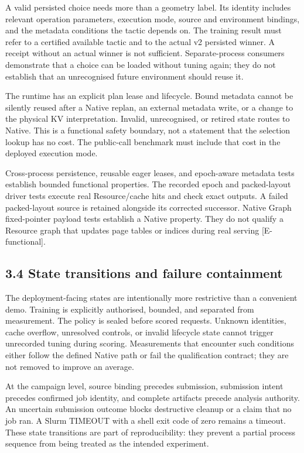 \documentclass[11pt,a4paper]{article}
\begin{document}
A valid persisted choice needs more than a geometry label. Its identity includes relevant operation parameters, execution mode, source and environment bindings, and the metadata conditions the tactic depends on. The training result must refer to a certified available tactic and to the actual v2 persisted winner. A receipt without an actual winner is not sufficient. Separate-process consumers demonstrate that a choice can be loaded without tuning again; they do not establish that an unrecognised future environment should reuse it.


The runtime has an explicit plan lease and lifecycle. Bound metadata cannot be silently reused after a Native replan, an external metadata write, or a change to the physical KV interpretation. Invalid, unrecognised, or retired state routes to Native. This is a functional safety boundary, not a statement that the selection lookup has no cost. The public-call benchmark must include that cost in the deployed execution mode.


Cross-process persistence, reusable eager leases, and epoch-aware metadata tests establish bounded functional properties. The recorded epoch and packed-layout driver tests execute real Resource/\allowbreak{}cache hits and check exact outputs. A failed packed-layout source is retained alongside its corrected successor. Native Graph fixed-pointer payload tests establish a Native property. They do not qualify a Resource graph that updates page tables or indices during real serving [E-functional].


\subsection*{3.4 State transitions and failure containment}

The deployment-facing states are intentionally more restrictive than a convenient demo. Training is explicitly authorised, bounded, and separated from measurement. The policy is sealed before scored requests. Unknown identities, cache overflow, unresolved controls, or invalid lifecycle state cannot trigger unrecorded tuning during scoring. Measurements that encounter such conditions either follow the defined Native path or fail the qualification contract; they are not removed to improve an average.


At the campaign level, source binding precedes submission, submission intent precedes confirmed job identity, and complete artifacts precede analysis authority. An uncertain submission outcome blocks destructive cleanup or a claim that no job ran. A Slurm TIMEOUT with a shell exit code of zero remains a timeout. These state transitions are part of reproducibility: they prevent a partial process sequence from being treated as the intended experiment.
\end{document}
